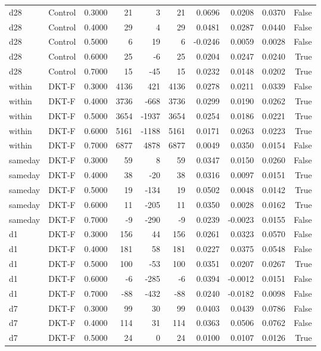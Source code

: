 \begin{tabular}{llrrrrrrrr}
d28 & Control & 0.3000 & 21 & 3 & 21 & 0.0696 & 0.0208 & 0.0370 & False \\
d28 & Control & 0.4000 & 29 & 4 & 29 & 0.0481 & 0.0287 & 0.0440 & False \\
d28 & Control & 0.5000 & 6 & 19 & 6 & -0.0246 & 0.0059 & 0.0028 & False \\
d28 & Control & 0.6000 & 25 & -6 & 25 & 0.0204 & 0.0247 & 0.0240 & True \\
d28 & Control & 0.7000 & 15 & -45 & 15 & 0.0232 & 0.0148 & 0.0202 & True \\
within & DKT-F & 0.3000 & 4136 & 421 & 4136 & 0.0278 & 0.0211 & 0.0339 & False \\
within & DKT-F & 0.4000 & 3736 & -668 & 3736 & 0.0299 & 0.0190 & 0.0262 & True \\
within & DKT-F & 0.5000 & 3654 & -1937 & 3654 & 0.0254 & 0.0186 & 0.0221 & True \\
within & DKT-F & 0.6000 & 5161 & -1188 & 5161 & 0.0171 & 0.0263 & 0.0223 & True \\
within & DKT-F & 0.7000 & 6877 & 4878 & 6877 & 0.0049 & 0.0350 & 0.0154 & False \\
sameday & DKT-F & 0.3000 & 59 & 8 & 59 & 0.0347 & 0.0150 & 0.0260 & False \\
sameday & DKT-F & 0.4000 & 38 & -20 & 38 & 0.0316 & 0.0097 & 0.0151 & True \\
sameday & DKT-F & 0.5000 & 19 & -134 & 19 & 0.0502 & 0.0048 & 0.0142 & True \\
sameday & DKT-F & 0.6000 & 11 & -205 & 11 & 0.0350 & 0.0028 & 0.0162 & True \\
sameday & DKT-F & 0.7000 & -9 & -290 & -9 & 0.0239 & -0.0023 & 0.0155 & False \\
d1 & DKT-F & 0.3000 & 156 & 44 & 156 & 0.0261 & 0.0323 & 0.0570 & False \\
d1 & DKT-F & 0.4000 & 181 & 58 & 181 & 0.0227 & 0.0375 & 0.0548 & False \\
d1 & DKT-F & 0.5000 & 100 & -53 & 100 & 0.0351 & 0.0207 & 0.0267 & True \\
d1 & DKT-F & 0.6000 & -6 & -285 & -6 & 0.0394 & -0.0012 & 0.0151 & False \\
d1 & DKT-F & 0.7000 & -88 & -432 & -88 & 0.0240 & -0.0182 & 0.0098 & False \\
d7 & DKT-F & 0.3000 & 99 & 30 & 99 & 0.0403 & 0.0439 & 0.0786 & False \\
d7 & DKT-F & 0.4000 & 114 & 31 & 114 & 0.0363 & 0.0506 & 0.0762 & False \\
d7 & DKT-F & 0.5000 & 24 & 0 & 24 & 0.0100 & 0.0107 & 0.0126 & True \\

\end{tabular}
